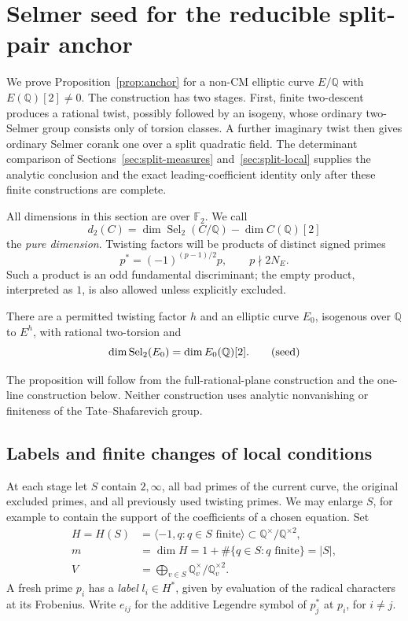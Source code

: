 \section{Selmer seed for the reducible split-pair anchor}\label{sec:reducible}

We prove Proposition~\ref{prop:anchor} for a non-CM elliptic curve
\(E/\mathbb Q\) with \(E(\mathbb Q)[2]\ne0\).  The construction has two
stages.  First, finite two-descent produces a rational twist, possibly
followed by an isogeny, whose ordinary two-Selmer group consists only of
torsion classes.  A further imaginary twist then gives ordinary Selmer
corank one over a split quadratic field.  The determinant comparison of
Sections~\ref{sec:split-measures} and~\ref{sec:split-local} supplies the
analytic conclusion and the exact leading-coefficient identity only after
these finite constructions are complete.

All dimensions in this section are over \(\mathbb F_2\).  We call
\[
 d_2(C)=\dim\operatorname{Sel}_2(C/\mathbb Q)-\dim C(\mathbb Q)[2]
\]
the \emph{pure dimension}.  Twisting factors will be products of distinct
signed primes
\[
 p^*=(-1)^{(p-1)/2}p,\qquad p\nmid 2N_E.
\]
Such a product is an odd fundamental discriminant; the empty product,
interpreted as \(1\), is also allowed unless explicitly excluded.

\begin{proposition}\label{prop:reducible-seed}
There are a permitted twisting factor \(h\) and an elliptic curve \(E_0\),
isogenous over \(\mathbb Q\) to \(E^h\), with rational two-torsion and
\[
                    \dim{\rm Sel}_2(E_0)=\dim E_0(\mathbb Q)[2].
                    \tag{seed}\label{eq:seed}
\]
\end{proposition}

The proposition will follow from the full-rational-plane construction and
the one-line construction below.  Neither construction uses analytic
nonvanishing or finiteness of the Tate--Shafarevich group.

\subsection{Labels and finite changes of local conditions}

At each stage let \(S\) contain \(2,\infty\), all bad primes of the current
curve, the original excluded primes, and all previously used twisting
primes.  We may enlarge \(S\), for example to contain the support of the
coefficients of a chosen equation.  Set
\[
 \begin{split}
 H=H(S)&=\langle-1,q:q\in S\text{ finite}\rangle
               \subset\mathbb Q^\times/\mathbb Q^{\times2},\\
 m&=\dim H=1+\#\{q\in S:q\text{ finite}\}=|S|,\\
 V&=\bigoplus_{v\in S}\mathbb Q_v^\times/\mathbb Q_v^{\times2}.
 \end{split}
\]
A fresh prime \(p_i\) has a \emph{label} \(l_i\in H^*\), given by evaluation
of the radical characters at its Frobenius.  Write \(e_{ij}\) for the
additive Legendre symbol of \(p_j^*\) at \(p_i\), for \(i\ne j\).

